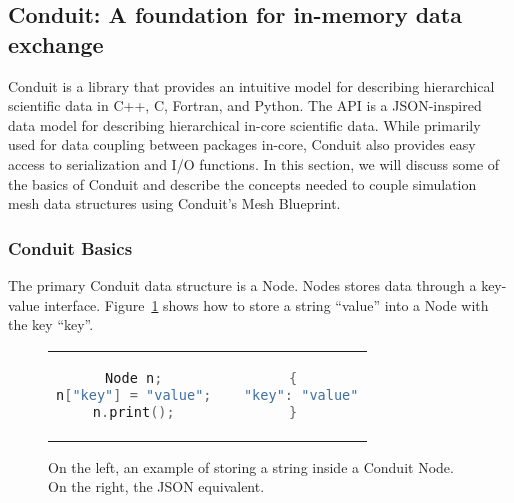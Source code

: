 \subsection{Conduit: A foundation for in-memory data exchange}
\label{sec:conduit}
Conduit is a library that provides an intuitive model for describing
hierarchical scientific data in C++, C, Fortran, and Python.
%
The API is a JSON-inspired data model for describing hierarchical
in-core scientific data.
%
While primarily used for data coupling between packages in-core,
Conduit also provides easy access to serialization and I/O functions.
%
In this section, we will discuss some of the basics of Conduit
and describe the concepts needed to couple simulation mesh
data structures using Conduit's Mesh Blueprint.


\subsubsection{Conduit Basics}
The primary Conduit data structure is a Node.
%
Nodes stores data through a key-value interface.
%
Figure~\ref{ex:1} shows how to store a string ``value'' into a Node
with the key ``key''.

\begin{figure}
\begin{tabular}{cc}
  \begin{minipage}{.5\textwidth}
  \centering
    \begin{lstlisting}[language=C++]
Node n;
n["key"] = "value";
n.print();
    \end{lstlisting}
  \end{minipage}
  &
  \begin{minipage}{.5\textwidth}
  \centering
  \begin{lstlisting}[language=C++]
{
  "key": "value"
}
  \end{lstlisting}
  \end{minipage}
\end{tabular}
\caption{\label{ex:1}On the left, an example of storing a string inside a Conduit Node. On the right, the JSON equivalent.}
\end{figure}

